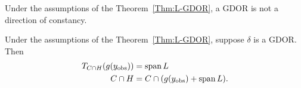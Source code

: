 \begin{corollary}
Under the assumptions of the Theorem~\ref{Thm:L-GDOR}, a GDOR is not a direction of constancy.
\end{corollary}

\begin{corollary} \label{Cor:spanL}
Under the assumptions of the Theorem~\ref{Thm:L-GDOR}, suppose $\delta$ is a GDOR.  Then
\begin{align*}
	T_{C \cap H} (g(y_{\text{obs}})) &= \operatorname{span} L \\
	C \cap H &= C \cap (g(y_{\text{obs}}) + \operatorname{span} L ). \\
\end{align*}
\end{corollary}

